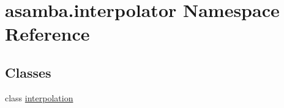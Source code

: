 \hypertarget{namespaceasamba_1_1interpolator}{}\section{asamba.\+interpolator Namespace Reference}
\label{namespaceasamba_1_1interpolator}
\subsection*{Classes}
\begin{DoxyCompactItemize}
\item 
class \hyperlink{classasamba_1_1interpolator_1_1interpolation}{interpolation}
\begin{DoxyCompactList}\small\item\em \paragraph*{}

\subsection*{}

\subsection*{}

\subsection*{}

\subsection*{}

\subsection*{}

\subparagraph*{}\end{DoxyCompactList}\end{DoxyCompactItemize}
